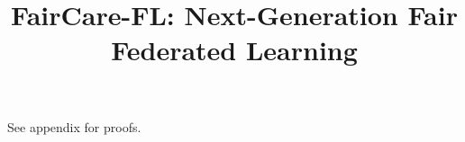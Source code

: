\documentclass{article}
\begin{document}
\title{FairCare-FL: Next-Generation Fair Federated Learning}
\maketitle
See appendix for proofs.

\end{document}
